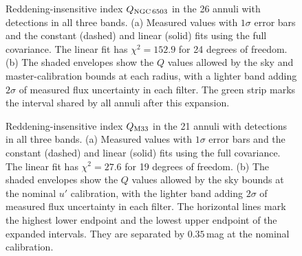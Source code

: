 \begin{figure}[t]
    \caption{Reddening-insensitive index $Q_{\rm NGC\,6503}$ in the 26 annuli with detections in all three bands. (a) Measured values with $1\sigma$ error bars and the constant (dashed) and linear (solid) fits using the full covariance. The linear fit has $\chi^2=152.9$ for 24 degrees of freedom. (b) The shaded envelopes show the $Q$ values allowed by the sky and master-calibration bounds at each radius, with a lighter band adding $2\sigma$ of measured flux uncertainty in each filter. The green strip marks the interval shared by all annuli after this expansion.}
    \label{fig:dust-only-ngc6503}
\end{figure}

\begin{figure}[t]
    \caption{Reddening-insensitive index $Q_{\rm M33}$ in the 21 annuli with detections in all three bands. (a) Measured values with $1\sigma$ error bars and the constant (dashed) and linear (solid) fits using the full covariance. The linear fit has $\chi^2=27.6$ for 19 degrees of freedom. (b) The shaded envelopes show the $Q$ values allowed by the sky bounds at the nominal $u'$ calibration, with the lighter band adding $2\sigma$ of measured flux uncertainty in each filter. The horizontal lines mark the highest lower endpoint and the lowest upper endpoint of the expanded intervals. They are separated by $0.35$\,mag at the nominal calibration.}
    \label{fig:dust-only-m33}
\end{figure}
